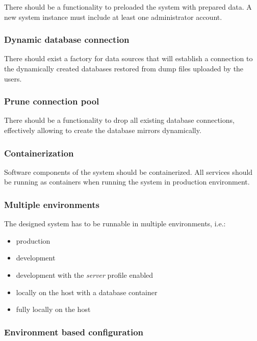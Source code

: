 \documentclass[a4paper,twoside,12pt]{book}
\begin{document}
There should be a functionality to preloaded the system with prepared data. A new system instance must include at least one administrator account.

\subsubsection{Dynamic database connection}

There should exist a factory for data sources that will establish a connection to the dynamically created databases restored from dump files uploaded by the users.

\subsubsection{Prune connection pool}

There should be a functionality to drop all existing database connections, effectively allowing to create the database mirrors dynamically.

\subsubsection{Containerization}

Software components of the system should be containerized. All services should be running as containers when running the system in production environment.

\subsubsection{Multiple environments}

The designed system has to be runnable in multiple environments, i.e.:

\begin{itemize}
\item production
\item development
\item development with the \textit{server} profile enabled
\item locally on the host with a database container
\item fully locally on the host
\end{itemize}

\subsubsection{Environment based configuration}
\end{document}

